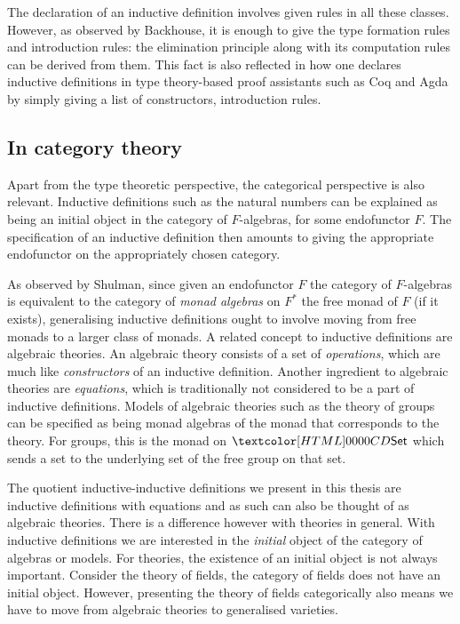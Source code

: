 The declaration of an inductive definition involves given rules in all
these classes. However, as observed by Backhouse, it is enough to give
the type formation rules and introduction rules: the elimination
principle along with its computation rules can be derived from
them. This fact is also reflected in how one declares inductive
definitions in type theory-based proof assistants such as Coq and Agda
by simply giving a list of constructors, \ie introduction rules.



\subsection{In category theory}
Apart from the type theoretic perspective, the categorical perspective
is also relevant. Inductive definitions such as the natural numbers
can be explained as being an initial object in the category of
$F$-algebras, for some endofunctor $F$. The specification of an
inductive definition then amounts to giving the appropriate
endofunctor on the appropriately chosen category.

As observed by Shulman, since given an endofunctor $F$ the category of
$F$-algebras is equivalent to the category of \emph{monad algebras} on
$F^*$ the free monad of $F$ (if it exists), generalising inductive
definitions ought to involve moving from free monads to a larger class
of monads. A related concept to inductive definitions are algebraic
theories. An algebraic theory consists of a set of \emph{operations},
which are much like \emph{constructors} of an inductive
definition. Another ingredient to algebraic theories are
\emph{equations}, which is traditionally not considered to be a part
of inductive definitions. Models of algebraic theories such as the
theory of groups can be specified as being monad algebras of the monad
that corresponds to the theory. For groups, this is the monad on
$\Set$ which sends a set to the underlying set of the free group on
that set.

The quotient inductive-inductive definitions we present in this thesis
are inductive definitions with equations and as such can also be
thought of as algebraic theories. There is a difference however with
theories in general. With inductive definitions we are interested in
the \emph{initial} object of the category of algebras or models. For
theories, the existence of an initial object is not always
important. Consider the theory of fields, the category of fields does
not have an initial object. However, presenting the theory of fields
categorically also means we have to move from algebraic theories to
generalised varieties. 

